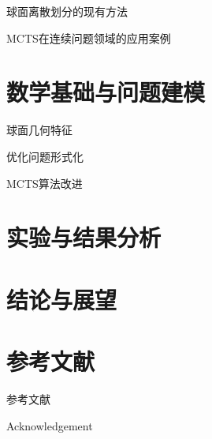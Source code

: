 \documentclass[12pt,aspectratio=169]{beamer}
\begin{document}
\begin{frame}{球面离散划分的现有方法}

  

\end{frame}

\begin{frame}{MCTS在连续问题领域的应用案例}

  

\end{frame}

\section{数学基础与问题建模}

\begin{frame}{球面几何特征}

  

\end{frame}

\begin{frame}{优化问题形式化}

  

\end{frame}

\begin{frame}{MCTS算法改进}

  

\end{frame}



\section{实验与结果分析}



\section{结论与展望}



\section{参考文献}

\begin{frame}[allowframebreaks]{参考文献}
  
  \printbibliography[heading=none]

\end{frame}

\begin{frame}{Acknowledgement}

  \begin{center}

    \textcolor{gray}{\Huge{\centerline{}}}

  \end{center}

\end{frame}
\end{document}
